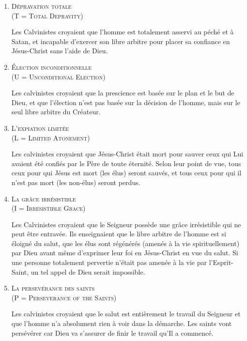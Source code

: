 \begin{enumerate}

  \item  \textsc{Dépravation totale\\ (\og T \fg{} = Total Depravity)}

Les Calvinistes croyaient que l'homme est totalement 
 asservi au péché  et à Satan,
 et incapable d'exercer son libre arbitre 
 pour placer sa confiance en Jésus-Christ sans l'aide de Dieu.

  \item  \textsc{Élection inconditionnelle\\ (\og U \fg{} = Unconditional Election)}

Les calvinistes croyaient que la prescience 
 est basée sur le plan et le but de Dieu, et que l'élection
 n'est pas basée sur la décision de l'homme, mais sur le seul \og libre arbitre \fg{}
 du Créateur.

  \item  \textsc{L'expiation limitée\\ (\og L \fg{} = Limited Atonement)}

Les calvinistes croyaient que Jésus-Christ était mort pour sauver
 ceux qui Lui avaient été confiés par le Père de toute éternité.
 Selon leur point de vue, tous ceux pour qui Jésus est mort (les élus) seront sauvés,
 et tous ceux pour qui il n'est pas mort (les non-élus) seront perdus.

  \item  \textsc{La grâce irrésistible\\ (\og I \fg{} = Irresistible Grace)}

Les Calvinistes croyaient que le Seigneur possède une grâce irrésistible
 qui ne peut être entravée. Ils enseignaient que le libre arbitre de l'homme
 est si éloigné du salut, que les élus sont régénérés (amenés à la vie spirituellement)
 par Dieu avant même d'exprimer leur foi en Jésus-Christ en vue du salut.
 Si une personne totalement pervertie n'était pas amenée à la vie par l'Esprit-Saint,
 un tel appel de Dieu serait impossible.

  \item  \textsc{La persevérance des saints\\ (\og P \fg{} = Perseverance of the Saints)}

Les calvinistes croyaient que le salut est entièrement le travail du Seigneur
 et que l'homme n'a absolument rien à voir dans la démarche.
 Les saints vont persévérer car Dieu va s'assurer de finir le travail
 qu'Il a commencé.

\end{enumerate}

